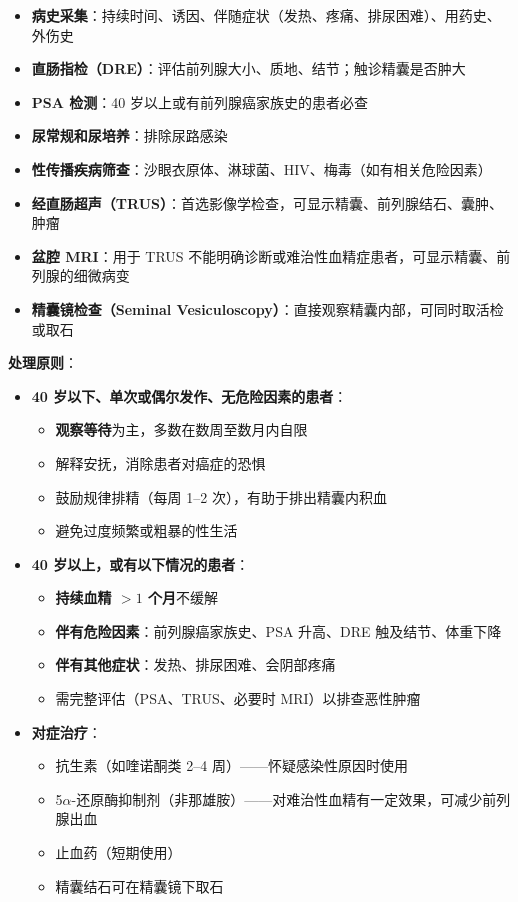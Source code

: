 \begin{enumerate}
\begin{itemize}[leftmargin=2cm]
	\item \textbf{病史采集}：持续时间、诱因、伴随症状（发热、疼痛、排尿困难）、用药史、外伤史
	\item \textbf{直肠指检（DRE）}：评估前列腺大小、质地、结节；触诊精囊是否肿大
	\item \textbf{PSA 检测}：40 岁以上或有前列腺癌家族史的患者必查
	\item \textbf{尿常规和尿培养}：排除尿路感染
	\item \textbf{性传播疾病筛查}：沙眼衣原体、淋球菌、HIV、梅毒（如有相关危险因素）
	\item \textbf{经直肠超声（TRUS）}：首选影像学检查，可显示精囊、前列腺结石、囊肿、肿瘤
	\item \textbf{盆腔 MRI}：用于 TRUS 不能明确诊断或难治性血精症患者，可显示精囊、前列腺的细微病变
	\item \textbf{精囊镜检查（Seminal Vesiculoscopy）}：直接观察精囊内部，可同时取活检或取石
\end{itemize}

\vspace{0.5em}
\noindent\textbf{处理原则}：

\begin{itemize}[leftmargin=2cm]
	\item \textbf{40 岁以下、单次或偶尔发作、无危险因素的患者}：
	\begin{itemize}
		\item \textbf{观察等待}为主，多数在数周至数月内自限
		\item 解释安抚，消除患者对癌症的恐惧
		\item 鼓励规律排精（每周 1--2 次），有助于排出精囊内积血
		\item 避免过度频繁或粗暴的性生活
	\end{itemize}

	\item \textbf{40 岁以上，或有以下情况的患者}：
	\begin{itemize}
		\item \textbf{持续血精 $>1$ 个月}不缓解
		\item \textbf{伴有危险因素}：前列腺癌家族史、PSA 升高、DRE 触及结节、体重下降
		\item \textbf{伴有其他症状}：发热、排尿困难、会阴部疼痛
		\item 需完整评估（PSA、TRUS、必要时 MRI）以排查恶性肿瘤
	\end{itemize}

	\item \textbf{对症治疗}：
	\begin{itemize}
		\item 抗生素（如喹诺酮类 2--4 周）——怀疑感染性原因时使用
		\item 5$\alpha$-还原酶抑制剂（非那雄胺）——对难治性血精有一定效果，可减少前列腺出血
		\item 止血药（短期使用）
		\item 精囊结石可在精囊镜下取石
	\end{itemize}
\end{itemize}


\end{enumerate}
